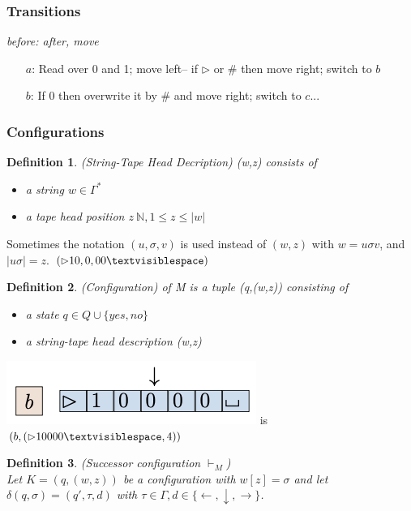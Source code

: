 \documentclass[a3paper, 8pt]{extarticle}
\newtheorem*{definition}{Definition}
\begin{document}
\begin{multicols*}{6}
\subsubsection{Transitions}
\begin{center}
    \textit{before: after, move}
\end{center}
\begin{itemize}
    \item[$a$:] Read over 0 and 1; move left– if $\rhd$ or \# then move right; switch to $b$
    \item[$b$:] If 0 then overwrite it by \# and move right; switch to $c$...
\end{itemize}
\subsubsection{Configurations}
\begin{definition}
     (String-Tape Head Decription)
     (w,z) consists of \begin{itemize}
        \item a string $w \in \Gamma^*$
        \item a tape head position $z \ \mathbb{N}, 1 \leq z \leq |w|$
     \end{itemize}
\end{definition}

Sometimes the notation $(u, \sigma, v)$ is used instead of  $(w,z)$ with $w=u\sigma v$, and $|u \sigma|=z$. $(\rhd 10, 0, 00 \textvisiblespace)$

\begin{definition}
     (Configuration) of M is a tuple (q,(w,z)) consisting of \begin{itemize}
         \item a state $q \in Q \cup \{yes, no\}$
         \item a string-tape head description (w,z)
     \end{itemize}
\end{definition}

\includegraphics[width=0.45\columnwidth]{images/Screen Shot 2022-12-26 at 17.26.16.png} is $(b,(\rhd 10000 \textvisiblespace ,4))$
\begin{definition}
     (Successor configuration $\vdash_M$)\\ Let $K=(q,(w,z))$ be a configuration with $w[z]=\sigma$ and let $\delta(q,\sigma)=(q',\tau, d)$ with $\tau \in \Gamma, d \in \{\leftarrow, \downarrow, \rightarrow\}$.


\end{definition}
\end{multicols*}
\end{document}
